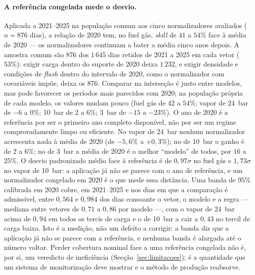 \paragraph{A referência congelada mede o desvio.}  Aplicada a 2021--2025 na
população comum aos cinco normalizadores avaliados ($n = 876$ dias), a
relação de 2020 tem, no fuel gás, \emph{skill} de $41$ a $54\%$ face à média
de 2020 --- os normalizadores continuam a bater a média cinco anos depois. A
amostra comum são 876 dos $1\,645$ dias retidos de 2021 a 2025 em cada vetor
($53\%$): exigir carga dentro do suporte de 2020 deixa $1\,232$, e exigir
densidade e condições de \emph{flash} dentro do intervalo de 2020, como o
normalizador com covariáveis impõe, deixa os 876. Comparar na interseção é
justo entre modelos, mas pode favorecer os períodos mais parecidos com 2020;
na população própria de cada modelo, os valores mudam pouco (fuel gás de
$42$ a $54\%$; vapor de 24~bar de $-6$ a $0\%$; 10~bar de $2$ a $6\%$;
3~bar de $-15$ a $-23\%$). O ano de 2020 é a referência por ser o primeiro
ano completo disponível, não por ser um regime comprovadamente limpo ou
eficiente.
No vapor de 24~bar nenhum normalizador acrescenta nada à média de 2020 (de
$-5{,}6\%$ a $+0{,}3\%$); no de 10~bar o ganho é de $2$ a $6\%$; no de
3~bar a média de 2020 é o melhor ``modelo'' de todos, por $16$ a $25\%$. O
desvio padronizado médio face à referência é de $0{,}97\sigma$ no fuel gás
e $1{,}73\sigma$ no vapor de 10~bar: a aplicação já não se parece com o ano
de referência, e um normalizador congelado em 2020 é o que mede essa
distância. Uma banda de $95\%$ calibrada em 2020 cobre, em 2021--2025 e nos
dias em que a comparação é admissível, entre $0{,}564$ e $0{,}984$ dos dias
consoante o vetor, o modelo e a regra --- mediana entre vetores de
$0{,}71$ a $0{,}86$ por modelo ---, com o vapor de 24~bar acima de $0{,}94$
em todos os tercis de carga e o de 10~bar a cair a $0{,}43$ no tercil de
carga baixa. Isto é a medição, não um defeito a corrigir: a banda diz que a
aplicação já não se parece com a referência, e nenhuma banda é alargada até
o número voltar. Perder cobertura nominal face a uma referência congelada
não é, por si, um veredicto de ineficiência (Secção~\ref{sec:limitacoes});
é a quantidade que um sistema de monitorização deve mostrar e o método de
produção reabsorve.

